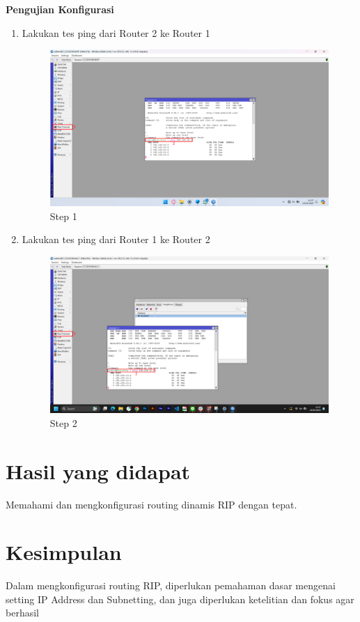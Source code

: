 \begin{center}
	\textbf{Pengujian Konfigurasi}
	\begin{enumerate}
		\item Lakukan tes ping dari Router 2 ke Router 1
		\begin{figure}[H]
			\centering
			\includegraphics[width=0.9\linewidth]{P2/img/per2/pc1/Step 6.png}
			\caption{Step 1}
			\label{fig:Ping Step 1(Per.2 PC1)}
		\end{figure}
		\item Lakukan tes ping dari Router 1 ke Router 2
		\begin{figure}[H]
			\centering
			\includegraphics[width=0.9\linewidth]{P2/img/per2/pc2/Step 6.png}
			\caption{Step 2}
			\label{fig:Ping Step 2(Per.2 PC2)}
		\end{figure}
	\end{enumerate}
\end{center}

\section{Hasil yang didapat}
Memahami dan mengkonfigurasi routing dinamis RIP dengan tepat.

\section{Kesimpulan}
Dalam mengkonfigurasi routing RIP, diperlukan pemahaman dasar mengenai setting IP Address dan Subnetting, dan juga diperlukan ketelitian dan fokus agar berhasil


